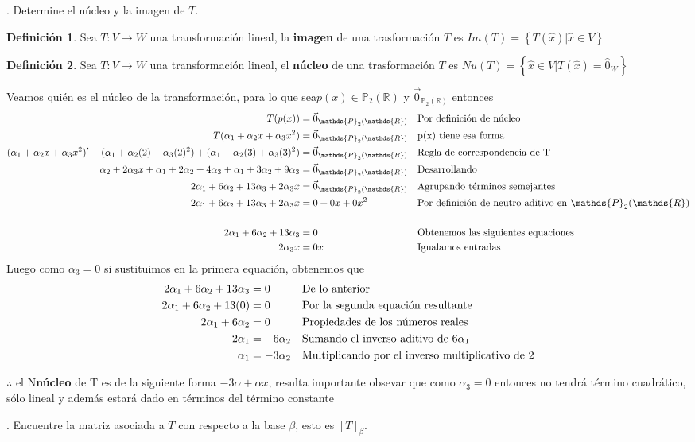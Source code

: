 \documentclass[letterpaper]{article}
\newcommand{\Po}{\mathds{P}_2(\mathds{R})}
\renewcommand{\*}{\cdot}
\theoremstyle{definition}
\newtheorem{definition}{Definición}
\begin{document}
. Determine el núcleo y la imagen de $T$.

\begin{definition}
Sea $ T: V \rightarrow W $ una transformación lineal, la \textbf{imagen} de una trasformación $ T $ es $Im(T) = \left\lbrace T(\hat{x}) | \hat{x} \in V  \right\rbrace$
\end{definition}
\begin{definition}
Sea $ T: V \rightarrow W $ una transformación lineal, el \textbf{núcleo} de una trasformación $ T $ es $Nu(T) = \left\lbrace \hat{x} \in V | T(\hat{x}) = \hat{0}_{W}  \right\rbrace$
\end{definition}
Veamos quién es el núcleo de la transformación, para lo que  sea$ p(x) \in \Po$ y $ \vec{0}_{\Po} $ entonces
\begin{align*}
	T(p(x)) &= \vec{0}_{\Po} && \text{Por definición de núcleo}\\
	T(\alpha_1 + \alpha_2x + \alpha_3x^2) &= \vec{0}_{\Po} && \text{p(x) tiene esa forma}\\
	(\alpha_1 + \alpha_2x + \alpha_3x^2)' + (\alpha_1 + \alpha_2(2) + \alpha_3(2)^2) + (\alpha_1 + \alpha_2(3) + \alpha_3(3)^2) &= \vec{0}_{\Po} && \text{Regla de correspondencia de T}\\
	\alpha_2 + 2\alpha_3x + \alpha_1 + 2\alpha_2 + 4\alpha_3 + \alpha_1  +3\alpha_2 + 9\alpha_3 &= \vec{0}_{\Po} && \text{Desarrollando}\\
	2\alpha_1  + 6\alpha_2 + 13\alpha_3 + 2\alpha_3x &= \vec{0}_{\Po} && \text{Agrupando términos semejantes}\\
	2\alpha_1  + 6\alpha_2 + 13\alpha_3 + 2\alpha_3x &= 0 + 0x + 0 x^2 && \text{Por definición de neutro aditivo en $ \Po $}\\
	\\
	2\alpha_1  + 6\alpha_2 + 13\alpha_3 &= 0  && \text{Obtenemos las siguientes equaciones}\\
	 2\alpha_3x &= 0x  && \text{Igualamos entradas}\\
\end{align*}
Luego como $ \alpha_3 = 0 $ si sustituimos en la primera equación, obtenemos que
\begin{align*}
		2\alpha_1  + 6\alpha_2 + 13\alpha_3 &= 0 && \text{De lo anterior}\\
		2\alpha_1  + 6\alpha_2 + 13(0) &= 0 && \text{Por la segunda equación resultante}\\
		2\alpha_1  + 6\alpha_2 &= 0 && \text{Propiedades de los números reales}\\
		2\alpha_1  &= -6\alpha_2 && \text{Sumando el inverso aditivo de $ 6\alpha_1 $}\\
		\alpha_1  &= -3\alpha_2 && \text{Multiplicando por  el inverso multiplicativo de 2}\\
\end{align*}
\begin{center}
	$ \therefore $ el N\textbf{núcleo} de T es de la siguiente forma $ -3\alpha + \alpha x $, resulta importante obsevar que como $ \alpha_3 = 0 $ entonces no tendrá término cuadrático, sólo lineal y además estará dado en términos del término constante
\end{center}
. Encuentre la matriz asociada a $T$ con respecto a la base $\beta$, esto es $[T]_{\beta}$.
\end{document}
